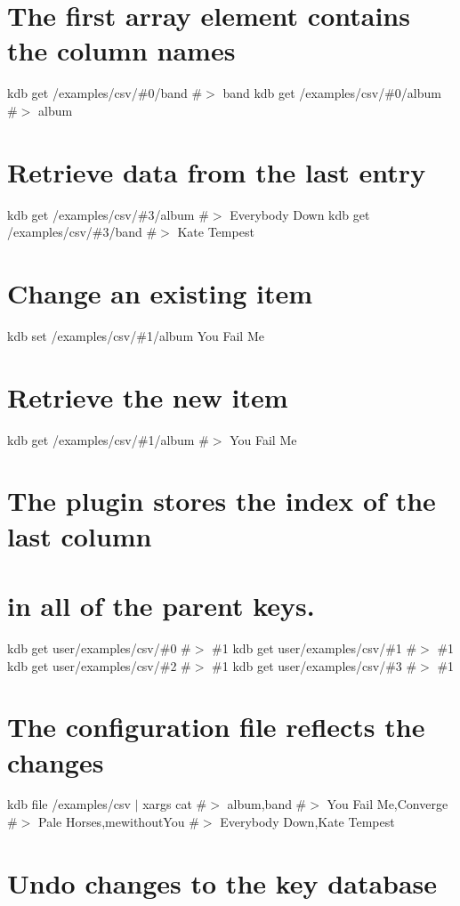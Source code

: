 \section*{The first array element contains the column names}

kdb get /examples/csv/\#0/band \#$>$ band kdb get /examples/csv/\#0/album \#$>$ album

\section*{Retrieve data from the last entry}

kdb get /examples/csv/\#3/album \#$>$ Everybody Down kdb get /examples/csv/\#3/band \#$>$ Kate Tempest

\section*{Change an existing item}

kdb set /examples/csv/\#1/album \textquotesingle{}You Fail Me\textquotesingle{} \section*{Retrieve the new item}

kdb get /examples/csv/\#1/album \#$>$ You Fail Me

\section*{The plugin stores the index of the last column}

\section*{in all of the parent keys.}

kdb get user/examples/csv/\#0 \#$>$ \#1 kdb get user/examples/csv/\#1 \#$>$ \#1 kdb get user/examples/csv/\#2 \#$>$ \#1 kdb get user/examples/csv/\#3 \#$>$ \#1

\section*{The configuration file reflects the changes}

kdb file /examples/csv $\vert$ xargs cat \#$>$ album,band \#$>$ You Fail Me,Converge \#$>$ Pale Horses,mewithout\+You \#$>$ Everybody Down,Kate Tempest

\section*{Undo changes to the key database}

